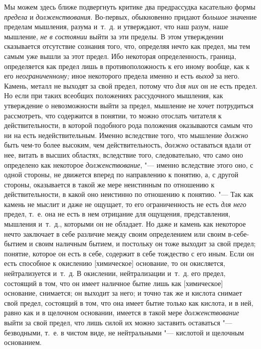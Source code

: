 Мы можем здесь ближе подвергнуть критике два предрассудка касательно формы
{\em предела} и {\em долженствования}. Во-первых, обыкновенно придают
{\em большое} значение пределам мышления, разума
и~т.~д. и утверждают, что наш разум, наше мышление,
{\em не в состоянии} выйти за эти пределы. В этом
утверждении сказывается отсутствие сознания того, что, определяя нечто как предел,
мы тем самым уже вышли за этот предел. Ибо некоторая определенность, граница,
определяется как предел лишь в противоположность к его иному вообще, как
к его {\em неограниченному;} иное некоторого предела
именно и есть {\em выход} за него. Камень, металл не
выходят за свой предел, потому что {\em для них} он не
есть предел. Но если при таких всеобщих положениях рассудочного мышления,
как утверждение о невозможности выйти за предел, мышление не хочет
потрудиться рассмотреть, что содержится в понятии, то можно отослать
читателя к действительности, в которой подобного рода положения оказываются
самым что ни на есть недействительным. Именно вследствие того, что мышление
{\em должно} быть чем-то более высоким, чем
действительность, {\em должно} оставаться вдали от нее,
витать в высших областях, вследствие того, следовательно, что само оно
определено как некоторое {\em долженствование}, "---
именно вследствие этого оно, с одной стороны, не движется вперед по
направлению к понятию, а, с другой стороны, оказывается в такой же мере
неистинным по отношению к действительности, в какой оно неистинно по
отношению к понятию. "--- Так как камень не мыслит и даже не ощущает, то его
ограниченность не есть {\em для него} предел, т.~е. она
не есть в нем отрицание для ощущения, представления, мышления и~т.~д.,
которыми он не обладает. Но даже и камень как некоторое нечто заключает в
себе различие между своим определением или своим в-себе-бытием и своим
наличным бытием, и постольку он тоже выходит за свой предел; понятие,
которое он есть в себе, содержит в себе тождество с его иным. Если он
есть способное к окислению [химическое] основание, то он окисляется,
нейтрализуется и~т.~д. В окислении, нейтрализации и~т.~д. его предел,
состоящий в том, что он имеет наличное бытие лишь как [химическое]
основание, снимается; он выходит за него; и точно так же и кислота снимает
свой предел, состоящий в том, что она имеет бытие только как кислота, и в
ней, равно как и в щелочном основании, имеется в такой мере
{\em долженствование} выйти за свой предел, что лишь
силой их можно заставить оставаться "--- безводными, т.~е. в чистом виде, не
нейтральными "--- кислотой и щелочным основанием.

